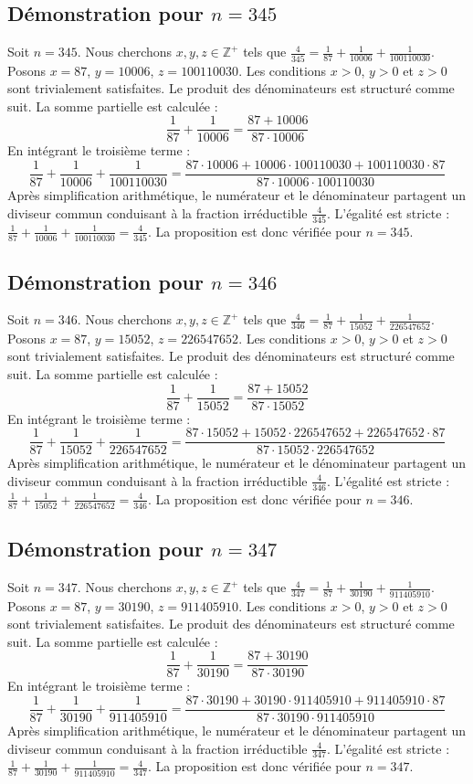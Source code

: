 \documentclass[11pt,a4paper]{article}
\begin{document}
\subsection{Démonstration pour $n = 345$}
Soit $n = 345$. Nous cherchons $x, y, z \in \mathbb{Z}^{+}$ tels que $\frac{4}{345} = \frac{1}{87} + \frac{1}{10006} + \frac{1}{100110030}$.
Posons $x = 87$, $y = 10006$, $z = 100110030$.
Les conditions $x > 0$, $y > 0$ et $z > 0$ sont trivialement satisfaites.
Le produit des dénominateurs est structuré comme suit. La somme partielle est calculée :
$$ \frac{1}{87} + \frac{1}{10006} = \frac{87+10006}{87 \cdot 10006} $$
En intégrant le troisième terme :
$$ \frac{1}{87} + \frac{1}{10006} + \frac{1}{100110030} = \frac{87 \cdot 10006 + 10006 \cdot 100110030 + 100110030 \cdot 87}{87 \cdot 10006 \cdot 100110030} $$
Après simplification arithmétique, le numérateur et le dénominateur partagent un diviseur commun conduisant à la fraction irréductible $\frac{4}{345}$.
L'égalité est stricte : $\frac{1}{87} + \frac{1}{10006} + \frac{1}{100110030} = \frac{4}{345}$.
La proposition est donc vérifiée pour $n = 345$.
\subsection{Démonstration pour $n = 346$}
Soit $n = 346$. Nous cherchons $x, y, z \in \mathbb{Z}^{+}$ tels que $\frac{4}{346} = \frac{1}{87} + \frac{1}{15052} + \frac{1}{226547652}$.
Posons $x = 87$, $y = 15052$, $z = 226547652$.
Les conditions $x > 0$, $y > 0$ et $z > 0$ sont trivialement satisfaites.
Le produit des dénominateurs est structuré comme suit. La somme partielle est calculée :
$$ \frac{1}{87} + \frac{1}{15052} = \frac{87+15052}{87 \cdot 15052} $$
En intégrant le troisième terme :
$$ \frac{1}{87} + \frac{1}{15052} + \frac{1}{226547652} = \frac{87 \cdot 15052 + 15052 \cdot 226547652 + 226547652 \cdot 87}{87 \cdot 15052 \cdot 226547652} $$
Après simplification arithmétique, le numérateur et le dénominateur partagent un diviseur commun conduisant à la fraction irréductible $\frac{4}{346}$.
L'égalité est stricte : $\frac{1}{87} + \frac{1}{15052} + \frac{1}{226547652} = \frac{4}{346}$.
La proposition est donc vérifiée pour $n = 346$.
\subsection{Démonstration pour $n = 347$}
Soit $n = 347$. Nous cherchons $x, y, z \in \mathbb{Z}^{+}$ tels que $\frac{4}{347} = \frac{1}{87} + \frac{1}{30190} + \frac{1}{911405910}$.
Posons $x = 87$, $y = 30190$, $z = 911405910$.
Les conditions $x > 0$, $y > 0$ et $z > 0$ sont trivialement satisfaites.
Le produit des dénominateurs est structuré comme suit. La somme partielle est calculée :
$$ \frac{1}{87} + \frac{1}{30190} = \frac{87+30190}{87 \cdot 30190} $$
En intégrant le troisième terme :
$$ \frac{1}{87} + \frac{1}{30190} + \frac{1}{911405910} = \frac{87 \cdot 30190 + 30190 \cdot 911405910 + 911405910 \cdot 87}{87 \cdot 30190 \cdot 911405910} $$
Après simplification arithmétique, le numérateur et le dénominateur partagent un diviseur commun conduisant à la fraction irréductible $\frac{4}{347}$.
L'égalité est stricte : $\frac{1}{87} + \frac{1}{30190} + \frac{1}{911405910} = \frac{4}{347}$.
La proposition est donc vérifiée pour $n = 347$.
\end{document}
